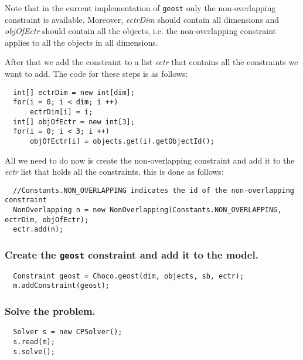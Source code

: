 \begin{note}
Note that in the current implementation of \texttt{geost} only the non-overlapping constraint is available. Moreover, 
\emph{ectrDim} should contain all dimensions and \emph{objOfEctr} should contain all the objects, i.e. the non-overlapping constraint applies to all the objects in all dimensions.
\end{note}
 
After that we add the constraint to a list \emph{ectr} that contains all the constraints we want to add.
The code for these steps is as follows: 
\begin{lstlisting}
  int[] ectrDim = new int[dim]; 
  for(i = 0; i < dim; i ++)  
      ectrDim[i] = i; 
  int[] objOfEctr = new int[3]; 
  for(i = 0; i < 3; i ++) 
      objOfEctr[i] = objects.get(i).getObjectId();
\end{lstlisting}
All we need to do now is create the non-overlapping constraint and add it to the \emph{ectr} list
that holds all the constraints. this is done as follows:
\begin{lstlisting}
  //Constants.NON_OVERLAPPING indicates the id of the non-overlapping constraint
  NonOverlapping n = new NonOverlapping(Constants.NON_OVERLAPPING, ectrDim, objOfEctr);
  ectr.add(n);
\end{lstlisting}

\subsubsection{Create the \texttt{geost} constraint and add it to the model.}\label{geostdescription:createthegeostconstraintandaddittothemodel}\hypertarget{geostdescription:createthegeostconstraintandaddittothemodel}{}
\begin{lstlisting}
  Constraint geost = Choco.geost(dim, objects, sb, ectr);
  m.addConstraint(geost);
\end{lstlisting}
	
\subsubsection{Solve the problem.}\label{geostdescription:solvetheproblem}\hypertarget{geostdescription:solvetheproblem}{}
\begin{lstlisting}
  Solver s = new CPSolver();
  s.read(m);
  s.solve();
\end{lstlisting}


